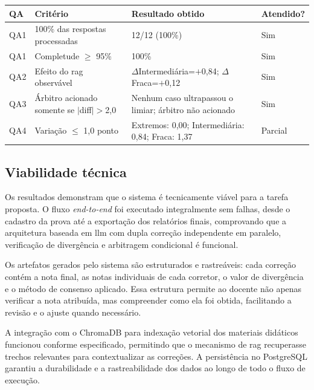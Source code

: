\begin{quadro}[H]
    \centering
    \caption{Síntese do atendimento aos critérios de sucesso}
    \label{qua:sintese-criterios}
    {\small
    \begin{tabularx}{\textwidth}{|p{}|p{}|p{}|>{\centering\arraybackslash}X|}
        \hline
        \textbf{QA} & \textbf{Critério} & \textbf{Resultado obtido} & \textbf{Atendido?} \\
        \hline
        QA1 & 100\% das respostas processadas & 12/12 (100\%) & Sim \\
        \hline
        QA1 & Completude $\geq$ 95\% & 100\% & Sim \\
        \hline
        QA2 & Efeito do \gls{rag} observável & $\Delta$Intermediária=$+$0,84; $\Delta$Fraca=$+$0,12 & Sim \\
        \hline
        QA3 & Árbitro acionado somente se $|$diff$|>$2,0 & Nenhum caso ultrapassou o limiar; árbitro não acionado & Sim \\
        \hline
        QA4 & Variação $\leq$ 1,0 ponto & Extremos: 0,00; Intermediária: 0,84; Fraca: 1,37 & Parcial \\
        \hline
    \end{tabularx}
    }
\end{quadro}

\subsection{Viabilidade técnica}

Os resultados demonstram que o sistema é tecnicamente viável para a tarefa proposta. O fluxo \textit{end-to-end} foi executado integralmente sem falhas, desde o cadastro da prova até a exportação dos relatórios finais, comprovando que a arquitetura baseada em \gls{llm} com dupla correção independente em paralelo, verificação de divergência e arbitragem condicional é funcional.

Os artefatos gerados pelo sistema são estruturados e rastreáveis: cada correção contém a nota final, as notas individuais de cada corretor, o valor de divergência e o método de consenso aplicado. Essa estrutura permite ao docente não apenas verificar a nota atribuída, mas compreender como ela foi obtida, facilitando a revisão e o ajuste quando necessário.

A integração com o ChromaDB para indexação vetorial dos materiais didáticos funcionou conforme especificado, permitindo que o mecanismo de \gls{rag} recuperasse trechos relevantes para contextualizar as correções. A persistência no PostgreSQL garantiu a durabilidade e a rastreabilidade dos dados ao longo de todo o fluxo de execução.

